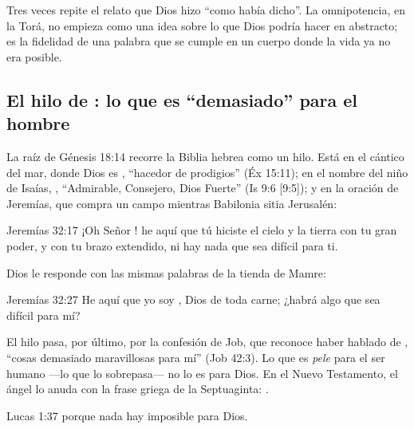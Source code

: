 Tres veces repite el relato que Dios hizo ``como había dicho''. La omnipotencia, en la Torá, no empieza como una idea sobre lo que Dios podría hacer en abstracto; es la fidelidad de una palabra que se cumple en un cuerpo donde la vida ya no era posible.

\subsection{El hilo de : lo que es “demasiado” para el hombre}

La raíz de Génesis 18:14 recorre la Biblia hebrea como un hilo. Está en el cántico del mar, donde Dios es , ``hacedor de prodigios'' (Éx 15:11); en el nombre del niño de Isaías, , ``Admirable, Consejero, Dios Fuerte'' (Is 9:6 [9:5]); y en la oración de Jeremías, que compra un campo mientras Babilonia sitia Jerusalén:

\begin{verso}{Jeremías 32:17}
¡Oh Señor \SENOR! he aquí que tú hiciste el cielo y la tierra con tu gran poder, y con tu brazo extendido, ni hay nada que sea difícil para ti.
\end{verso}

Dios le responde con las mismas palabras de la tienda de Mamre:

\begin{verso}{Jeremías 32:27}
He aquí que yo soy \SENOR, Dios de toda carne; ¿habrá algo que sea difícil para mí?
\end{verso}

El hilo pasa, por último, por la confesión de Job, que reconoce haber hablado de , ``cosas demasiado maravillosas para mí'' (Job 42:3). Lo que es \emph{pele} para el ser humano ---lo que lo sobrepasa--- no lo es para Dios. En el Nuevo Testamento, el ángel lo anuda con la frase griega de la Septuaginta: .

\begin{verso}{Lucas 1:37}
porque nada hay imposible para Dios.
\end{verso}

